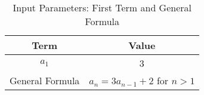 \documentclass[12pt]{article}
\begin{document}
\begin{table}[h]
  \centering
  \caption{Input Parameters: First Term and General Formula}
  \begin{tabular}{|c|c|}
    \hline
    \textbf{Term} & \textbf{Value} \\
    \hline
    \(a_1\) & 3 \\
    General Formula & \(a_n = 3a_{n-1} + 2\) for \(n > 1\) \\
    \hline
  \end{tabular}
\end{table}
\end{document}
